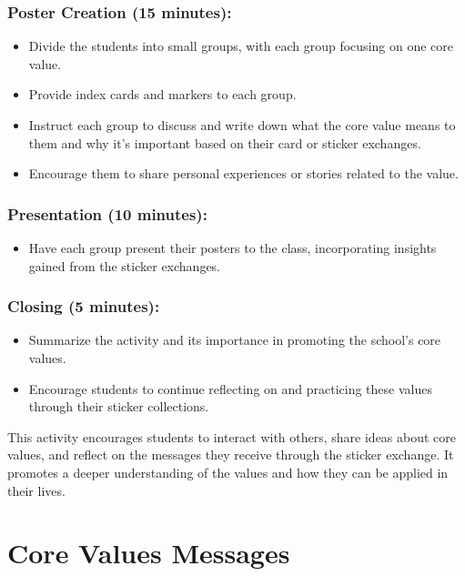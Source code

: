 \documentclass[14pt, letterpaper, twoside]{article}
\begin{document}
	\subsubsection{Poster Creation (15 minutes):}
	\begin{itemize}
	\item Divide the students into small groups, with each group focusing on one core
	value.
	\item Provide index cards and markers to each group.
	\item Instruct each group to discuss and write down what the core value means to them
	and why it's important based on their card or sticker exchanges.
	\item Encourage them to share personal experiences or stories related to the value.
	\end{itemize}
	\subsubsection{Presentation (10 minutes):}
	\begin{itemize}
	\item Have each group present their posters to the class, incorporating insights
	gained from the sticker exchanges.
	\end{itemize}
	\subsubsection{Closing (5 minutes):}
	\begin{itemize}
	\item Summarize the activity and its importance in promoting the school's core values.
	\item Encourage students to continue reflecting on and practicing these values through
	their sticker collections.
	\end{itemize}
This activity encourages students to interact with others, share ideas about core values, and reflect on the messages they receive through the sticker exchange. It promotes a deeper understanding of the values and how they can be applied in their lives.
\pagebreak
\section{Core Values Messages}
\end{document}
